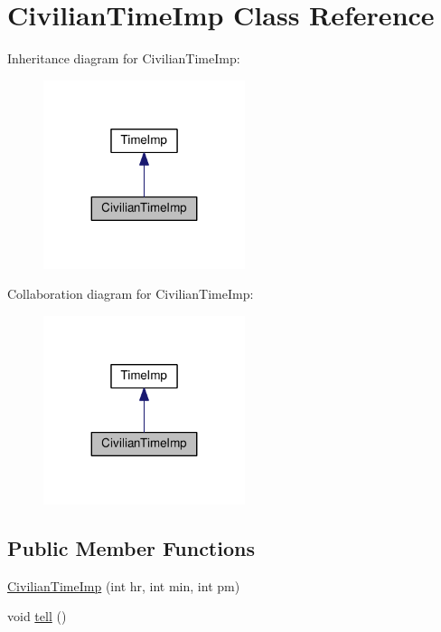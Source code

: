 \hypertarget{classCivilianTimeImp}{}\section{Civilian\+Time\+Imp Class Reference}
\label{classCivilianTimeImp}


Inheritance diagram for Civilian\+Time\+Imp\+:
\nopagebreak
\begin{figure}[H]
\begin{center}
\leavevmode
\includegraphics[width=167pt]{classCivilianTimeImp__inherit__graph}
\end{center}
\end{figure}


Collaboration diagram for Civilian\+Time\+Imp\+:
\nopagebreak
\begin{figure}[H]
\begin{center}
\leavevmode
\includegraphics[width=167pt]{classCivilianTimeImp__coll__graph}
\end{center}
\end{figure}
\subsection*{Public Member Functions}
\begin{DoxyCompactItemize}
\item 
\hyperlink{classCivilianTimeImp_a81d01c53e19c0b8732b125c036c17ddb}{Civilian\+Time\+Imp} (int hr, int min, int pm)
\item 
void \hyperlink{classCivilianTimeImp_a244dd99398227e08c4e8075c85e035b3}{tell} ()
\end{DoxyCompactItemize}
